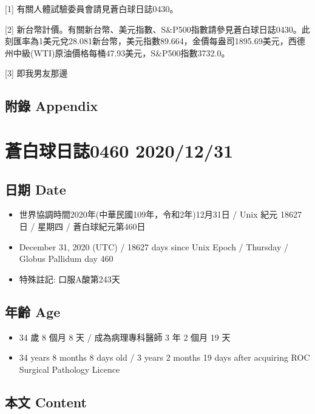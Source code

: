 \documentclass[
]{article}
\providecommand{\tightlist}{%
  \setlength{\itemsep}{0pt}\setlength{\parskip}{0pt}}
\begin{document}
{[}1{]} 有關人體試驗委員會請見蒼白球日誌0430。

{[}2{]}
新台幣計價。有關新台幣、美元指數、S\&P500指數請參見蒼白球日誌0430。此刻匯率為1美元兌28.081新台幣，美元指數89.664，金價每盎司1895.69美元，西德州中級(WTI)原油價格每桶47.93美元，S\&P500指數3732.0。

{[}3{]} 即我男友那邊

\hypertarget{ux9644ux9304-appendix-29}{%
\subsection{附錄 Appendix}\label{ux9644ux9304-appendix-29}}

\hypertarget{ux84bcux767dux7403ux65e5ux8a8c0460-20201231}{%
\section{蒼白球日誌0460
2020/12/31}\label{ux84bcux767dux7403ux65e5ux8a8c0460-20201231}}

\hypertarget{ux65e5ux671f-date-30}{%
\subsection{日期 Date}\label{ux65e5ux671f-date-30}}

\begin{itemize}
\tightlist
\item
  世界協調時間2020年(中華民國109年，令和2年)12月31日 / Unix 紀元 18627
  日 / 星期四 / 蒼白球紀元第460日
\item
  December 31, 2020 (UTC) / 18627 days since Unix Epoch / Thursday /
  Globus Pallidum day 460
\item
  特殊註記: 口服A酸第243天
\end{itemize}

\hypertarget{ux5e74ux9f61-age-30}{%
\subsection{年齡 Age}\label{ux5e74ux9f61-age-30}}

\begin{itemize}
\tightlist
\item
  34 歲 8 個月 8 天 / 成為病理專科醫師 3 年 2 個月 19 天
\item
  34 years 8 months 8 days old / 3 years 2 months 19 days after
  acquiring ROC Surgical Pathology Licence
\end{itemize}

\hypertarget{ux672cux6587-content-30}{%
\subsection{本文 Content}\label{ux672cux6587-content-30}}
\end{document}
